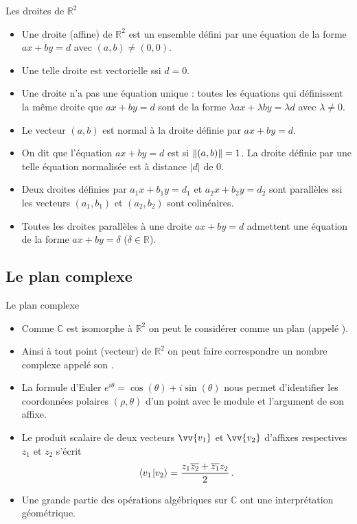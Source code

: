 \documentclass{m53beamer}
\begin{document}
\begin{frame}{Les droites de \texorpdfstring{$\mathbb{R}^{2}$}{R²}}
  \begin{itemize}[<+(1)->]
    \item Une droite (affine) de $\mathbb{R}^{2}$ est un ensemble défini par une équation de la forme $ax+by=d$ avec $(a,b) \neq (0,0)$.
    \item Une telle droite est vectorielle ssi $d=0$.
    \item Une droite n'a pas une équation unique : toutes les équations qui définissent la même droite que $ax+by=d$ sont de la forme $\lambda ax+\lambda by=\lambda d$ avec $\lambda\neq0$.
    \item Le vecteur $(a,b)$ est \alert{normal} à la droite définie par $ax+by=d$.
    \item On dit que l'équation $ax+by=d$ est  si $\left\|(a,b)\right\|=1$. La droite définie par une telle équation normalisée est à distance $|d|$ de $0$.
    \item Deux droites définies par $a_{1}x+b_{1}y=d_{1}$ et $a_{2}x+b_{2}y=d_{2}$ sont parallèles ssi les vecteurs $(a_{1},b_{1})$ et $(a_{2},b_{2})$ sont colinéaires.
    \item Toutes les droites parallèles à une droite $ax+by=d$ admettent une équation de la forme $ax+by=\delta$ ($\delta \in \mathbb{R}$).
  \end{itemize}
\end{frame}

\subsection{Le plan complexe}

\begin{frame}{Le plan complexe}
  \begin{itemize}[<+(1)->]
    \item Comme $\mathbb{C}$ est  isomorphe à $\mathbb{R}^{2}$ on peut le considérer comme un plan (appelé ).
    \item Ainsi à tout point (vecteur) de $\mathbb{R}^{2}$ on peut faire correspondre un nombre complexe appelé son .
    \item La formule d'Euler $e^{i\theta}=\cos(\theta)+i\sin(\theta)$ nous permet d'identifier les coordonnées polaires $(\rho,\theta)$ d'un point avec le module et l'argument de son affixe.
    \item Le produit scalaire de deux vecteurs $\vv{v_{1}}$ et $\vv{v_{2}}$ d'affixes respectives $z_{1}$ et $z_{2}$ s'écrit
    \[
        \langle{v_{1}}\kern1pt |{v_{2}}\rangle = \frac{z_{1}\overline{z_{2}}+\overline{z_{1}}z_{2}}{2}\,.
    \]
    \item Une grande partie des opérations algébriques sur $\mathbb{C}$ ont une interprétation géométrique.
  \end{itemize}
\end{frame}
\end{document}
